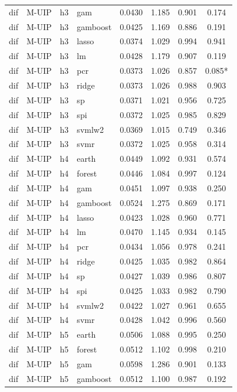 \begin{ThreePartTable}
\begin{longtable}[t]{llclcccc}
dif & M-UIP & h3 & gam & 0.0430 & 1.185 & 0.901 & 0.174\\
dif & M-UIP & h3 & gamboost & 0.0425 & 1.169 & 0.886 & 0.191\\
dif & M-UIP & h3 & lasso & 0.0374 & 1.029 & 0.994 & 0.941\\
dif & M-UIP & h3 & lm & 0.0428 & 1.179 & 0.907 & 0.119\\
dif & M-UIP & h3 & pcr & 0.0373 & 1.026 & 0.857 & 0.085*\\
dif & M-UIP & h3 & ridge & 0.0373 & 1.026 & 0.988 & 0.903\\
dif & M-UIP & h3 & sp & 0.0371 & 1.021 & 0.956 & 0.725\\
dif & M-UIP & h3 & spi & 0.0372 & 1.025 & 0.985 & 0.829\\
dif & M-UIP & h3 & svmlw2 & 0.0369 & 1.015 & 0.749 & 0.346\\
dif & M-UIP & h3 & svmr & 0.0372 & 1.025 & 0.958 & 0.314\\
\addlinespace
dif & M-UIP & h4 & earth & 0.0449 & 1.092 & 0.931 & 0.574\\
dif & M-UIP & h4 & forest & 0.0446 & 1.084 & 0.997 & 0.124\\
dif & M-UIP & h4 & gam & 0.0451 & 1.097 & 0.938 & 0.250\\
dif & M-UIP & h4 & gamboost & 0.0524 & 1.275 & 0.869 & 0.171\\
dif & M-UIP & h4 & lasso & 0.0423 & 1.028 & 0.960 & 0.771\\
dif & M-UIP & h4 & lm & 0.0470 & 1.145 & 0.934 & 0.145\\
dif & M-UIP & h4 & pcr & 0.0434 & 1.056 & 0.978 & 0.241\\
dif & M-UIP & h4 & ridge & 0.0425 & 1.035 & 0.982 & 0.864\\
dif & M-UIP & h4 & sp & 0.0427 & 1.039 & 0.986 & 0.807\\
dif & M-UIP & h4 & spi & 0.0425 & 1.033 & 0.982 & 0.790\\
dif & M-UIP & h4 & svmlw2 & 0.0422 & 1.027 & 0.961 & 0.655\\
dif & M-UIP & h4 & svmr & 0.0428 & 1.042 & 0.996 & 0.560\\
\addlinespace
dif & M-UIP & h5 & earth & 0.0506 & 1.088 & 0.995 & 0.250\\
dif & M-UIP & h5 & forest & 0.0512 & 1.102 & 0.998 & 0.210\\
dif & M-UIP & h5 & gam & 0.0598 & 1.286 & 0.901 & 0.133\\
dif & M-UIP & h5 & gamboost & 0.0512 & 1.100 & 0.987 & 0.192\\

\end{longtable}
\end{ThreePartTable}
